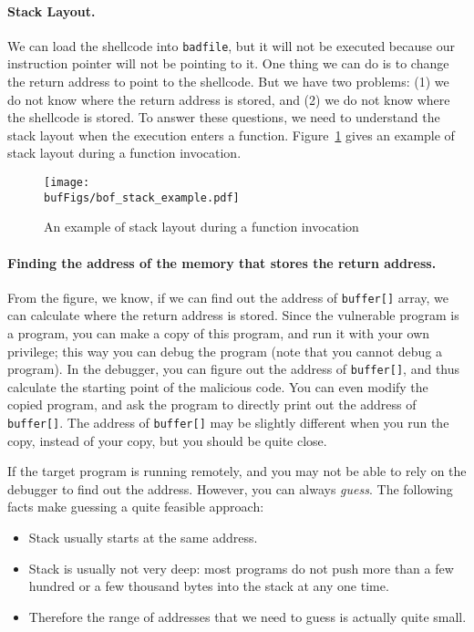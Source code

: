 \paragraph{Stack Layout.}
We can load the shellcode into \texttt{badfile}, but it will not be executed because our
instruction pointer will not be pointing to it. One thing we can do is to change
the return address to point to the shellcode. But we have two problems:
(1) we do not know where the return address is stored, and
(2) we do not know where the shellcode is stored.
To answer these questions, we need to understand the stack layout when the 
execution enters a function. Figure~\ref{fig:buffer_overflow_stack_example}
gives an example of stack layout during a function invocation.


\begin{figure}[htb]
	\centering
	\texttt{[image: \\bufFigs/bof\_stack\_example.pdf]}
	\caption{An example of stack layout during a function invocation}
	\label{fig:buffer_overflow_stack_example}
\end{figure}


\paragraph{Finding the address of the memory that stores the return address.}
From the figure, we know, if we can find out the address of {\tt buffer[]} array, 
we can calculate where the return address is stored. 
Since the vulnerable program is a \setuid program, you can make a copy of this program,
and run it with your own privilege; this way you can debug the program (note that
you cannot debug a \setuid program). In the debugger, you can figure out
the address of {\tt buffer[]}, and thus calculate the starting point of
the malicious code. You can even modify the copied program, and ask the 
program to directly print out the address of {\tt buffer[]}.
The address of {\tt buffer[]} may be slightly
different when you run the \setuid copy, instead of your copy, but
you should be quite close. 

If the target program is running remotely, and you may not be able to
rely on the debugger to find out the address. However, you can always
{\em guess}. The following facts make guessing a quite feasible approach:
      \begin{itemize}
      \item Stack usually starts at the same address.
      \item Stack is usually not very deep: most programs do not push more than
            a few hundred or a few thousand bytes into the stack at any one time.
      \item Therefore the range of addresses that we need to guess is actually
            quite small.
      \end{itemize}

